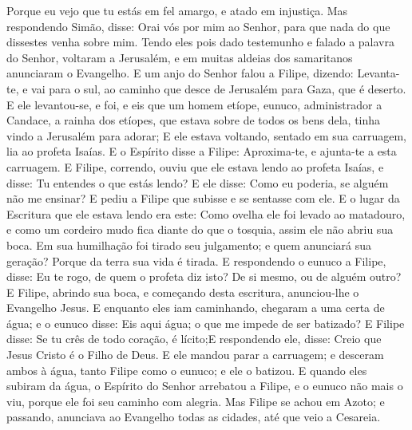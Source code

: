 {Porque eu vejo que tu estás em fel amargo, e atado em injustiça.
Mas respondendo Simão, disse: Orai vós por mim ao Senhor, para que nada do que dissestes venha sobre mim.
Tendo eles pois dado testemunho e falado a palavra do Senhor, voltaram a Jerusalém, e em muitas aldeias dos samaritanos anunciaram o Evangelho.
E um anjo do Senhor falou a Filipe, dizendo: Levanta-te, e vai para o sul, ao caminho que desce de Jerusalém para Gaza, que é deserto.
E ele levantou-se, e foi, e eis que um homem etíope, eunuco, administrador
{} a Candace, a rainha dos etíopes, que estava sobre
{} de todos os bens dela, tinha vindo a Jerusalém para adorar;
E ele estava voltando, sentado em sua carruagem,
{} lia ao profeta Isaías.
E o Espírito disse a Filipe: Aproxima-te, e ajunta-te a esta carruagem.
E Filipe, correndo, ouviu que ele estava lendo ao profeta Isaías, e disse: Tu entendes o que estás lendo?
E ele disse: Como eu poderia, se alguém não me ensinar? E pediu a Filipe que subisse e se sentasse com ele.
E o lugar da Escritura que ele estava lendo era este: Como ovelha ele foi levado ao matadouro, e como um cordeiro mudo fica diante do que o tosquia, assim
{} ele não abriu sua boca.
Em sua humilhação foi tirado seu julgamento; e quem anunciará sua geração? Porque da terra sua vida é tirada.
E respondendo o eunuco a Filipe, disse: Eu te rogo, de quem o profeta diz isto? De si mesmo, ou de alguém outro?
E Filipe, abrindo sua boca, e começando desta escritura, anunciou-lhe o Evangelho
{} Jesus.
E enquanto eles iam caminhando, chegaram a uma certa
{} de água; e o eunuco disse: Eis aqui água; o que me impede de ser batizado?
E Filipe disse: Se tu crês de todo coração,
{} é lícito;E respondendo ele, disse: Creio que Jesus Cristo é o Filho de Deus.
E ele mandou parar a carruagem; e desceram ambos à água, tanto Filipe como o eunuco; e ele o batizou.
E quando eles subiram da água, o Espírito do Senhor arrebatou a Filipe, e o eunuco não mais o viu, porque ele foi
{} seu caminho com alegria.
Mas Filipe se achou em Azoto; e passando, anunciava ao Evangelho
{} todas as cidades, até que veio a Cesareia.

}

